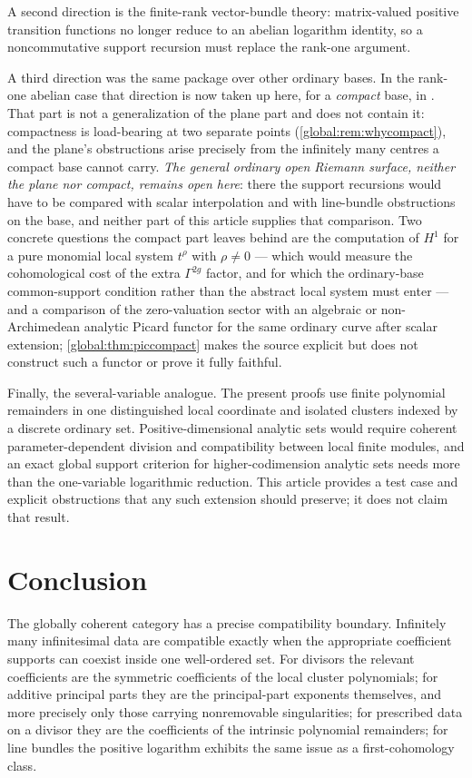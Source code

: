 \documentclass[11pt,letterpaper]{article}
\theoremstyle{definition}
\theoremstyle{remark}
\numberwithin{equation}{section}
\begin{document}
A second direction is the finite-rank vector-bundle theory: matrix-valued positive transition functions no longer reduce to an abelian logarithm identity, so a noncommutative support recursion must replace the rank-one argument.

A third direction was the same package over other ordinary bases. In the rank-one abelian case that direction is now taken up here, for a \emph{compact} base, in . That part is not a generalization of the plane part and does not contain it: compactness is load-bearing at two separate points (\cref{global:rem:whycompact}), and the plane's obstructions arise precisely from the infinitely many centres a compact base cannot carry. \emph{The general ordinary \emph{open} Riemann surface, neither the plane nor compact, remains open here}: there the support recursions would have to be compared with scalar interpolation and with line-bundle obstructions on the base, and neither part of this article supplies that comparison. Two concrete questions the compact part leaves behind are the computation of $H^1$ for a pure monomial local system $t^\rho$ with $\rho\ne0$ --- which would measure the cohomological cost of the extra $\Gamma^{2g}$ factor, and for which the ordinary-base common-support condition rather than the abstract local system must enter --- and a comparison of the zero-valuation sector with an algebraic or non-Archimedean analytic Picard functor for the same ordinary curve after scalar extension; \cref{global:thm:piccompact} makes the source explicit but does not construct such a functor or prove it fully faithful.

Finally, the several-variable analogue. The present proofs use finite polynomial remainders in one distinguished local coordinate and isolated clusters indexed by a discrete ordinary set. Positive-dimensional analytic sets would require coherent parameter-dependent division and compatibility between local finite modules, and an exact global support criterion for higher-codimension analytic sets needs more than the one-variable logarithmic reduction. This article provides a test case and explicit obstructions that any such extension should preserve; it does not claim that result.

\section{Conclusion}

The globally coherent category has a precise compatibility boundary. Infinitely many infinitesimal data are compatible exactly when the appropriate coefficient supports can coexist inside one well-ordered set. For divisors the relevant coefficients are the symmetric coefficients of the local cluster polynomials; for additive principal parts they are the principal-part exponents themselves, and more precisely only those carrying nonremovable singularities; for prescribed data on a divisor they are the coefficients of the intrinsic polynomial remainders; for line bundles the positive logarithm exhibits the same issue as a first-cohomology class.
\end{document}
